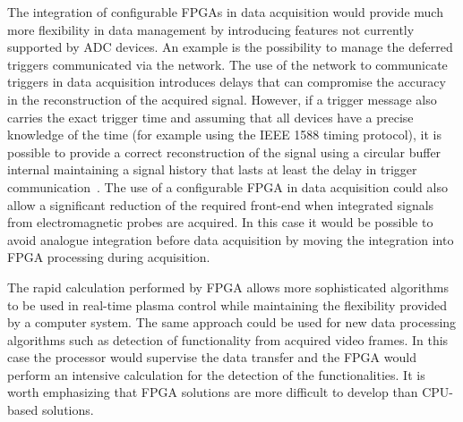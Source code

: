 The integration of configurable FPGAs in data acquisition would provide much more flexibility in data management by introducing features not currently supported by ADC devices. An example is the possibility to manage the deferred triggers communicated via the network. The use of the network to communicate triggers in data acquisition introduces delays that can compromise the accuracy in the reconstruction of the acquired signal. However, if a trigger message also carries the exact trigger time and assuming that all devices have a precise knowledge of the time (for example using the IEEE 1588 timing protocol), it is possible to provide a correct reconstruction of the signal using a circular buffer internal maintaining a signal history that lasts at least the delay in trigger communication~\cite{ana_11}. The use of a configurable FPGA in data acquisition could also allow a significant reduction of the required front-end when integrated signals from electromagnetic probes are acquired. In this case it would be possible to avoid analogue integration before data acquisition by moving the integration into FPGA processing during acquisition.

The rapid calculation performed by FPGA allows more sophisticated algorithms to be used in real-time plasma control while maintaining the flexibility provided by a computer system. The same approach could be used for new data processing algorithms such as detection of functionality from acquired video frames. In this case the processor would supervise the data transfer and the FPGA would perform an intensive calculation for the detection of the functionalities. It is worth emphasizing that FPGA solutions are more difficult to develop than CPU-based solutions.

